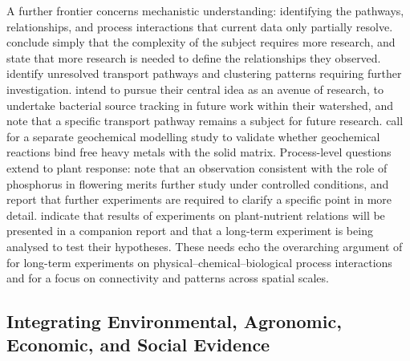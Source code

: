 \documentclass[11pt]{article}
\begin{document}
A further frontier concerns mechanistic understanding: identifying the pathways, relationships, and process interactions that current data only partially resolve. \textcite{Malone2014} conclude simply that the complexity of the subject requires more research, and \textcite{Cui2016} state that more research is needed to define the relationships they observed. \textcite{Petersen2012} identify unresolved transport pathways and clustering patterns requiring further investigation. \textcite{Tomer2008} intend to pursue their central idea as an avenue of research, to undertake bacterial source tracking in future work within their watershed, and note that a specific transport pathway remains a subject for future research. \textcite{Ali2013} call for a separate geochemical modelling study to validate whether geochemical reactions bind free heavy metals with the solid matrix. Process-level questions extend to plant response: \textcite{GiménezValero2025} note that an observation consistent with the role of phosphorus in flowering merits further study under controlled conditions, and \textcite{Tamura2021} report that further experiments are required to clarify a specific point in more detail. \textcite{LAL1993} indicate that results of experiments on plant-nutrient relations will be presented in a companion report and that a long-term experiment is being analysed to test their hypotheses. These needs echo the overarching argument of \textcite{Rogger2017} for long-term experiments on physical--chemical--biological process interactions and for a focus on connectivity and patterns across spatial scales.

\subsection{Integrating Environmental, Agronomic, Economic, and Social Evidence}
\end{document}
